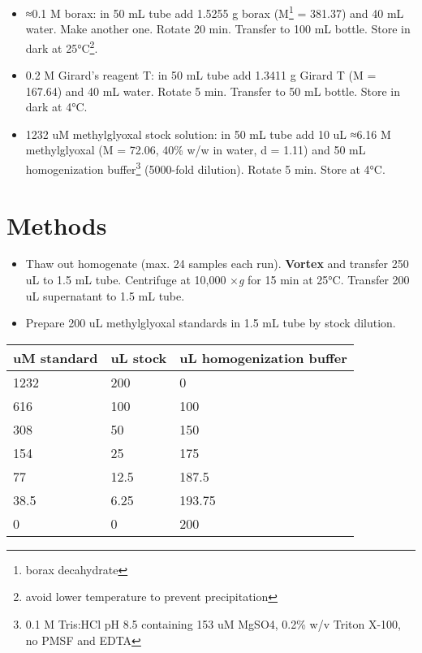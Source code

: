 \documentclass[
]{book}
\providecommand{\tightlist}{%
  \setlength{\itemsep}{0pt}\setlength{\parskip}{0pt}}
\begin{document}
\begin{itemize}
\tightlist
\item
  ≈0.1 M borax: in 50 mL tube add 1.5255 g borax (M\footnote{borax decahydrate} = 381.37) and 40 mL water. Make another one. Rotate 20 min. Transfer to 100 mL bottle. Store in dark at 25°C\footnote{avoid lower temperature to prevent precipitation}.
\item
  0.2 M Girard's reagent T: in 50 mL tube add 1.3411 g Girard T (M = 167.64) and 40 mL water. Rotate 5 min. Transfer to 50 mL bottle. Store in dark at 4°C.
\item
  1232 uM methylglyoxal stock solution: in 50 mL tube add 10 uL ≈6.16 M methylglyoxal (M = 72.06, 40\% w/w in water, d = 1.11) and 50 mL homogenization buffer\footnote{0.1 M Tris:HCl pH 8.5 containing 153 uM MgSO4, 0.2\% w/v Triton X-100, no PMSF and EDTA} (5000-fold dilution). Rotate 5 min. Store at 4°C.
\end{itemize}

\hypertarget{methods-5}{%
\section{Methods}\label{methods-5}}

\begin{itemize}
\tightlist
\item
  Thaw out homogenate (max. 24 samples each run). \textbf{Vortex} and transfer 250 uL to 1.5 mL tube. Centrifuge at 10,000 ×\emph{g} for 15 min at 25°C. Transfer 200 uL supernatant to 1.5 mL tube.
\item
  Prepare 200 uL methylglyoxal standards in 1.5 mL tube by stock dilution.
\end{itemize}

\begin{longtable}[]{@{}lll@{}}
\toprule()
uM standard & uL stock & uL homogenization buffer \\
\midrule()
\endhead
1232 & 200 & 0 \\
616 & 100 & 100 \\
308 & 50 & 150 \\
154 & 25 & 175 \\
77 & 12.5 & 187.5 \\
38.5 & 6.25 & 193.75 \\
0 & 0 & 200 \\
\bottomrule()
\end{longtable}
\end{document}
